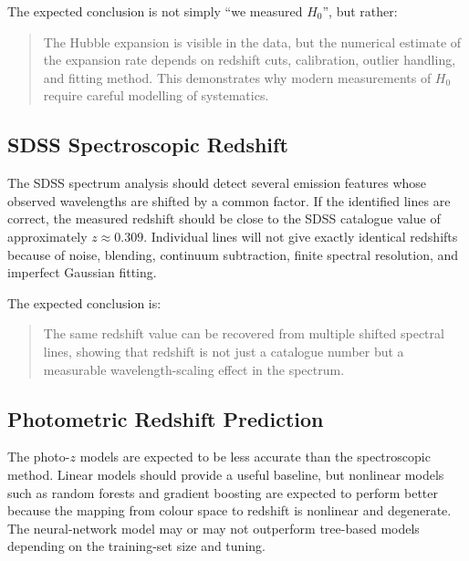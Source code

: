 \documentclass[11pt,a4paper]{article}
\begin{document}
The expected conclusion is not simply ``we measured $H_0$'', but rather:

\begin{quote}
The Hubble expansion is visible in the data, but the numerical estimate of the expansion rate depends on redshift cuts, calibration, outlier handling, and fitting method. This demonstrates why modern measurements of $H_0$ require careful modelling of systematics.
\end{quote}

\subsection{SDSS Spectroscopic Redshift}

The SDSS spectrum analysis should detect several emission features whose observed wavelengths are shifted by a common factor. If the identified lines are correct, the measured redshift should be close to the SDSS catalogue value of approximately $z \approx 0.309$. Individual lines will not give exactly identical redshifts because of noise, blending, continuum subtraction, finite spectral resolution, and imperfect Gaussian fitting.

The expected conclusion is:

\begin{quote}
The same redshift value can be recovered from multiple shifted spectral lines, showing that redshift is not just a catalogue number but a measurable wavelength-scaling effect in the spectrum.
\end{quote}

\subsection{Photometric Redshift Prediction}

The photo-$z$ models are expected to be less accurate than the spectroscopic method. Linear models should provide a useful baseline, but nonlinear models such as random forests and gradient boosting are expected to perform better because the mapping from colour space to redshift is nonlinear and degenerate. The neural-network model may or may not outperform tree-based models depending on the training-set size and tuning.
\end{document}
